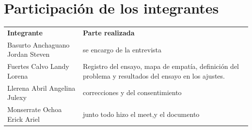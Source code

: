 \documentclass[12pt,a4paper]{article}
\begin{document}
\section{Participación de los integrantes}

\begin{table}[H]
\centering
\small
\begin{tabularx}{\textwidth}{>{\raggedright\arraybackslash}p{5.5cm} Y}
\textbf{Integrante} & \textbf{Parte realizada} \\
Basurto Anchaguano Jordan Steven & {se encargo de la entrevista} \\
Fuertes Calvo Landy Lorena & Registro del ensayo, mapa de empatía, definición del problema y resultados del ensayo en los ajustes. \\
Llerena Abril Angelina Julexy & {correcciones y del consentimiento} \\
Monserrate Ochoa Erick Ariel & {junto todo hizo el meet,y el documento} \\
\end{tabularx}

\end{table}
\end{document}
